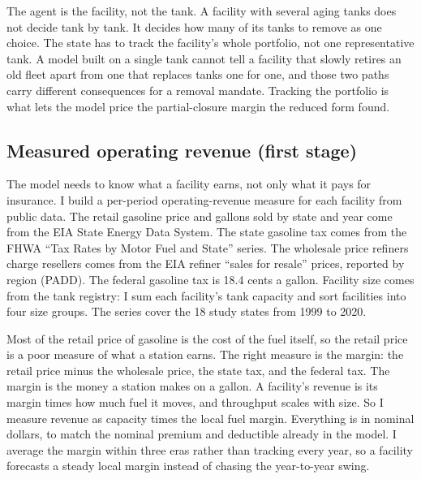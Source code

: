 \documentclass[
  12pt,
]{article}
\begin{document}
The agent is the facility, not the tank. A facility with several aging
tanks does not decide tank by tank. It decides how many of its tanks to
remove as one choice. The state has to track the facility's whole
portfolio, not one representative tank. A model built on a single tank
cannot tell a facility that slowly retires an old fleet apart from one
that replaces tanks one for one, and those two paths carry different
consequences for a removal mandate. Tracking the portfolio is what lets
the model price the partial-closure margin the reduced form found.

\subsection{Measured operating revenue (first
stage)}\label{measured-operating-revenue-first-stage}

The model needs to know what a facility earns, not only what it pays for
insurance. I build a per-period operating-revenue measure for each
facility from public data. The retail gasoline price and gallons sold by
state and year come from the EIA State Energy Data System. The state
gasoline tax comes from the FHWA ``Tax Rates by Motor Fuel and State''
series. The wholesale price refiners charge resellers comes from the EIA
refiner ``sales for resale'' prices, reported by region (PADD). The
federal gasoline tax is 18.4 cents a gallon. Facility size comes from
the tank registry: I sum each facility's tank capacity and sort
facilities into four size groups. The series cover the 18 study states
from 1999 to 2020.

Most of the retail price of gasoline is the cost of the fuel itself, so
the retail price is a poor measure of what a station earns. The right
measure is the margin: the retail price minus the wholesale price, the
state tax, and the federal tax. The margin is the money a station makes
on a gallon. A facility's revenue is its margin times how much fuel it
moves, and throughput scales with size. So I measure revenue as capacity
times the local fuel margin. Everything is in nominal dollars, to match
the nominal premium and deductible already in the model. I average the
margin within three eras rather than tracking every year, so a facility
forecasts a steady local margin instead of chasing the year-to-year
swing.
\end{document}
